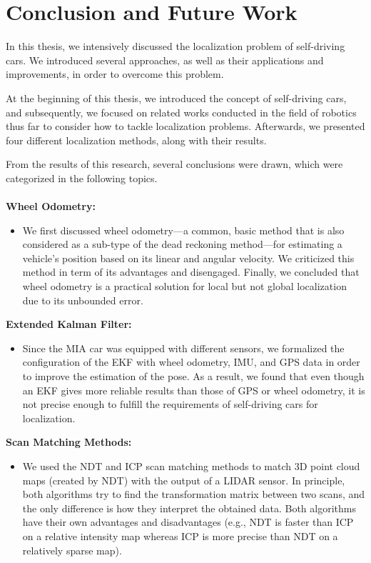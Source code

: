 \chapter{Conclusion and Future Work}\label{chp:6}
In this thesis, we intensively discussed the localization problem of self-driving cars. We introduced several approaches, as well as their applications and improvements, in order to overcome this problem. 
\par At the beginning of this thesis, we introduced the concept of self-driving cars, and subsequently, we focused on related works conducted in the field of robotics thus far to consider how to tackle localization problems. Afterwards, we presented four different localization methods, along with their results.
\par From the results of this research, several conclusions were drawn, which were categorized in the following topics.
\\
\\
\textbf{Wheel Odometry:}
\begin{itemize}
    \item We first discussed wheel odometry—a common, basic method that is also considered as a sub-type of the dead reckoning method—for estimating a vehicle's position based on its linear and angular velocity. We criticized this method in term of its advantages and disengaged. Finally, we concluded that wheel odometry is a practical solution for local but not global localization due to its unbounded error.    
\end{itemize}
\textbf{Extended Kalman Filter:}
\begin{itemize}
    \item Since the MIA car was equipped with different sensors, we formalized the configuration of the EKF with wheel odometry, IMU, and GPS data in order to improve the estimation of the pose. As a result, we found that even though an EKF gives more reliable results than those of GPS or wheel odometry, it is not precise enough to fulfill the requirements of self-driving cars for localization.
\end{itemize}
\textbf{Scan Matching Methods:}
\begin{itemize}
    \item We used the NDT and ICP scan matching methods to match 3D point cloud maps (created by NDT) with the output of a LIDAR sensor. In principle, both algorithms try to find the transformation matrix between two scans, and the only difference is how they interpret the obtained data. Both algorithms have their own advantages and disadvantages (e.g., NDT is faster than ICP on a relative intensity map whereas ICP is more precise than NDT on a relatively sparse map).
\end{itemize}

